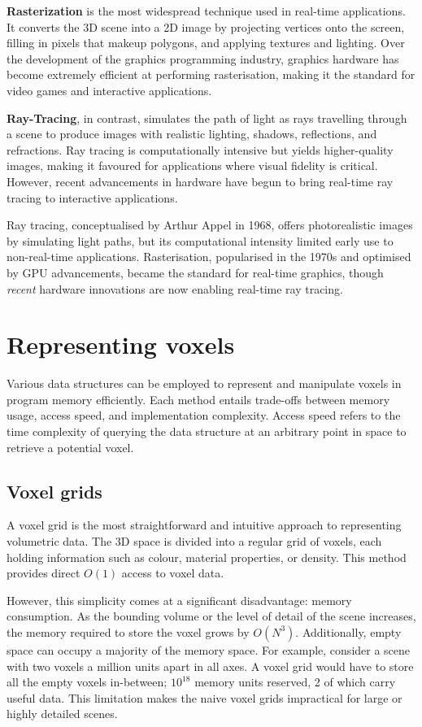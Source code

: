 \textbf{Rasterization} is the most widespread technique used in real-time applications.
It converts the 3D scene into a 2D image by projecting vertices onto the screen, filling in pixels that makeup polygons, and applying textures and lighting.
Over the development of the graphics programming industry, graphics hardware has become extremely efficient at performing rasterisation, making it the standard for video games and interactive applications.

\textbf{Ray-Tracing}, in contrast, simulates the path of light as rays travelling through a scene to produce images with realistic lighting, shadows, reflections, and refractions. Ray tracing is computationally intensive but yields higher-quality images, making it favoured for applications where visual fidelity is critical. However, recent advancements in hardware have begun to bring real-time ray tracing to interactive applications.

Ray tracing, conceptualised by Arthur Appel in 1968\supercite{appel}, offers photorealistic images by simulating light paths, but its computational intensity limited early use to non-real-time applications. Rasterisation, popularised in the 1970s and optimised by GPU advancements, became the standard for real-time graphics, though \emph{recent} hardware innovations are now enabling real-time ray tracing.

\section{Representing voxels}
Various data structures can be employed to represent and manipulate voxels in program memory efficiently. Each method entails trade-offs between memory usage, access speed, and implementation complexity. Access speed refers to the time complexity of querying the data structure at an arbitrary point in space to retrieve a potential voxel.

\subsection{Voxel grids}
A voxel grid is the most straightforward and intuitive approach to representing volumetric data. The 3D space is divided into a regular grid of voxels, each holding information such as colour, material properties, or density. This method provides direct $O(1)$ access to voxel data.

However, this simplicity comes at a significant disadvantage: memory consumption.
As the bounding volume or the level of detail of the scene increases, the memory required to store the voxel grows by $O(N^{3})$.
Additionally, empty space can occupy a majority of the memory space.
For example, consider a scene with two voxels a million units apart in all axes.
A voxel grid would have to store all the empty voxels in-between; $10^{18}$ memory units reserved, 2 of which carry useful data.
This limitation makes the naive voxel grids impractical for large or highly detailed scenes.

